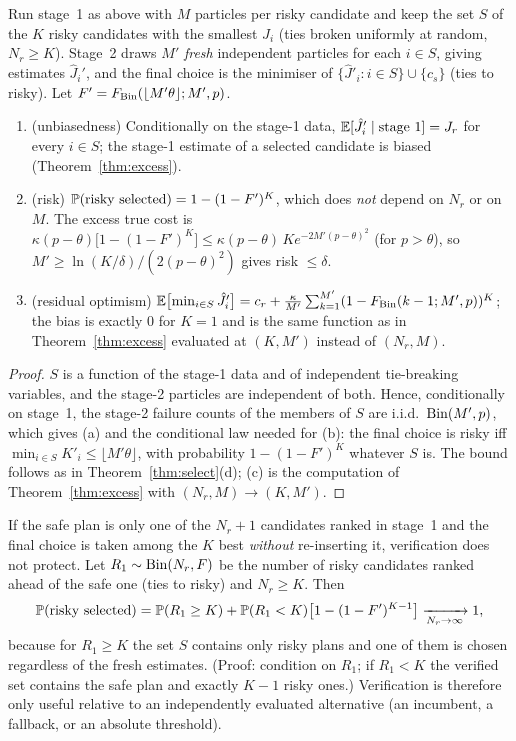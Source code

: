 \begin{theorem}\label{thm:verify}
Run stage~1 as above with $M$ particles per risky candidate and keep the set $S$ of the $K$ risky candidates with the smallest $\hat J_i$ (ties broken uniformly at random, $N_r\ge K$).
Stage~2 draws $M'$ \emph{fresh} independent particles for each $i\in S$, giving estimates $\hat J_i'$, and the final choice is the minimiser of $\{\hat J'_i:i\in S\}\cup\{c_s\}$ (ties to risky). Let $F'=F_{\operatorname{Bin}}(\lfloor M'\theta\rfloor;M',p)$.
\begin{enumerate}
\item[(a)] (unbiasedness) Conditionally on the stage-1 data, $\mathbb{E}[\hat J'_i\mid\text{stage 1}]=J_r$ for every $i\in S$; the stage-1 estimate of a selected candidate is biased (Theorem~\ref{thm:excess}).
\item[(b)] (risk) $\mathbb{P}(\text{risky selected})=1-(1-F')^K$, which does \emph{not} depend on $N_r$ or on $M$.
The excess true cost is $\kappa(p-\theta)\bigl[1-(1-F')^K\bigr]\le\kappa(p-\theta)\,K e^{-2M'(p-\theta)^2}$ (for $p>\theta$), so $M'\ge\ln(K/\delta)/(2(p-\theta)^2)$ gives risk $\le\delta$.
\item[(c)] (residual optimism) $\mathbb{E}\bigl[\min_{i\in S}\hat J_i'\bigr]=c_r+\frac\kappa{M'}\sum_{k=1}^{M'}(1-F_{\operatorname{Bin}}(k-1;M',p))^K$; the bias is exactly $0$ for $K=1$ and is the same function as in Theorem~\ref{thm:excess} evaluated at $(K,M')$ instead of $(N_r,M)$.
\end{enumerate}
\end{theorem}
\begin{proof}
$S$ is a function of the stage-1 data and of independent tie-breaking variables, and the stage-2 particles are independent of both. Hence, conditionally on stage~1, the stage-2 failure counts of the members of $S$ are i.i.d.\ $\operatorname{Bin}(M',p)$, which gives (a) and the conditional law needed for (b): the final choice is risky iff $\min_{i\in S}K'_i\le\lfloor M'\theta\rfloor$, with probability $1-(1-F')^K$ whatever $S$ is. The bound follows as in Theorem~\ref{thm:select}(d); (c) is the computation of Theorem~\ref{thm:excess} with $(N_r,M)\to(K,M')$.
\end{proof}

\begin{remark}\label{rem:fallback}
If the safe plan is only one of the $N_r+1$ candidates ranked in stage~1 and the final choice is taken among the $K$ best \emph{without} re-inserting it, verification does not protect.
Let $R_1\sim\operatorname{Bin}(N_r,F)$ be the number of risky candidates ranked ahead of the safe one (ties to risky) and $N_r\ge K$. Then
\[
\mathbb{P}(\text{risky selected})=\mathbb{P}(R_1\ge K)+\mathbb{P}(R_1<K)\bigl[1-(1-F')^{K-1}\bigr]\xrightarrow[N_r\to\infty]{}1 ,
\]
because for $R_1\ge K$ the set $S$ contains only risky plans and one of them is chosen regardless of the fresh estimates. (Proof: condition on $R_1$; if $R_1<K$ the verified set contains the safe plan and exactly $K-1$ risky ones.)
Verification is therefore only useful relative to an independently evaluated alternative (an incumbent, a fallback, or an absolute threshold).
\end{remark}

